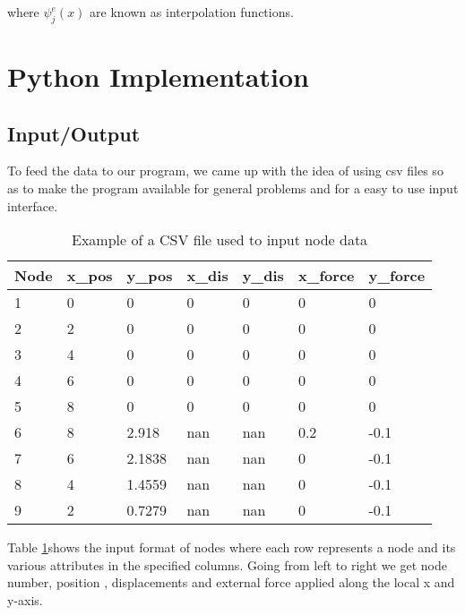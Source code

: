 where $\psi_j^e(x)$ are known as interpolation functions.

\pagebreak

\section{\bf Python Implementation}

\subsection{Input/Output}
To feed the data to our program, we came up with the idea of using csv files so as to make the program available for general problems and for a easy to use input interface.\\


\begin{table}[h!]
	\centering
	\begin{tabular}{|l|l|l|l|l|l|l|}
		\hline
		Node & x\_pos & y\_pos & x\_dis & y\_dis & x\_force & y\_force \\
		\hline
		1    & 0      & 0      & 0      & 0      & 0        & 0        \\
		2    & 2      & 0      & 0      & 0      & 0        & 0        \\
		3    & 4      & 0      & 0      & 0      & 0        & 0        \\
		4    & 6      & 0      & 0      & 0      & 0        & 0        \\
		5    & 8      & 0      & 0      & 0      & 0        & 0        \\
		6    & 8      & 2.918  & nan    & nan    & 0.2      & -0.1     \\
		7    & 6      & 2.1838 & nan    & nan    & 0        & -0.1     \\
		8    & 4      & 1.4559 & nan    & nan    & 0        & -0.1     \\
		9    & 2      & 0.7279 & nan    & nan    & 0        & -0.1  	\\
		\hline  
	\end{tabular}
		\caption{Example of a CSV file used to input node data}
	\label{node_csv_table}
\end{table}

Table \ref{node_csv_table}shows the input format of nodes where each row represents a node and its various attributes in the specified columns. Going from left to right we get node number, position , displacements and external force applied along the local x and y-axis.\\

